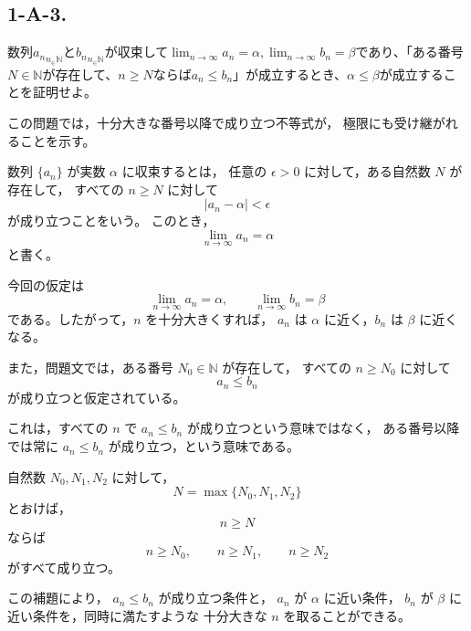 \subsection{1-A-3.}
\begin{exercise}
	数列${a_n}_{n_\in\mathbb{N}}$と${b_n}_{n_\in\mathbb{N}}$が収束して$\lim_{n\rightarrow\infty}a_n=\alpha,\lim_{n\rightarrow\infty}b_n=\beta$であり、「ある番号$N\in\mathbb{N}$が存在して、$n\geq N$ならば$a_n\leq b_n$」が成立するとき、$\alpha\leq\beta$が成立することを証明せよ。
\end{exercise}
\begin{background}
	この問題では，十分大きな番号以降で成り立つ不等式が，
	極限にも受け継がれることを示す。

	\begin{definition}[数列の収束]
		数列 $\{a_n\}$ が実数 $\alpha$ に収束するとは，
		任意の $\epsilon>0$ に対して，ある自然数 $N$ が存在して，
		すべての $n\geq N$ に対して
		\[
			|a_n-\alpha|<\epsilon
		\]
		が成り立つことをいう。
		このとき，
		\[
			\lim_{n\to\infty}a_n=\alpha
		\]
		と書く。
	\end{definition}

	\begin{remark}
		今回の仮定は
		\[
			\lim_{n\to\infty}a_n=\alpha,
			\qquad
			\lim_{n\to\infty}b_n=\beta
		\]
		である。したがって，$n$ を十分大きくすれば，
		$a_n$ は $\alpha$ に近く，$b_n$ は $\beta$ に近くなる。
	\end{remark}

	\begin{remark}
		また，問題文では，ある番号 $N_0\in\mathbb{N}$ が存在して，
		すべての $n\geq N_0$ に対して
		\[
			a_n\leq b_n
		\]
		が成り立つと仮定されている。

		これは，すべての $n$ で $a_n\leq b_n$ が成り立つという意味ではなく，
		ある番号以降では常に $a_n\leq b_n$ が成り立つ，という意味である。
	\end{remark}

	\begin{lemma}[有限個の自然数の最大値]
		自然数 $N_0,N_1,N_2$ に対して，
		\[
			N=\max\{N_0,N_1,N_2\}
		\]
		とおけば，
		\[
			n\geq N
		\]
		ならば
		\[
			n\geq N_0,\qquad n\geq N_1,\qquad n\geq N_2
		\]
		がすべて成り立つ。
	\end{lemma}

	\begin{remark}
		この補題により，
		$a_n\leq b_n$ が成り立つ条件と，
		$a_n$ が $\alpha$ に近い条件，
		$b_n$ が $\beta$ に近い条件を，同時に満たすような
		十分大きな $n$ を取ることができる。
	\end{remark}
\end{background}

